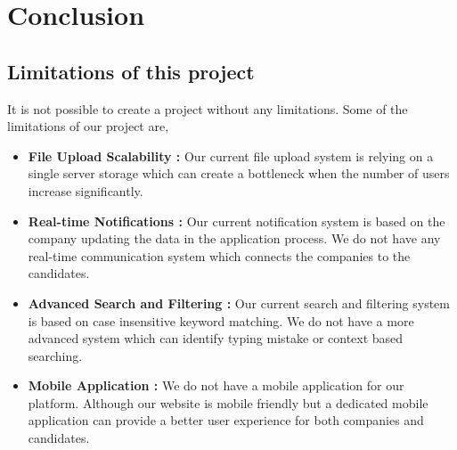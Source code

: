 \documentclass[a4paper, 14pt, openany]{extreport}
\begin{document}
	\chapter{Conclusion}
	\section{Limitations of this project}
	It is not possible to create a project without any limitations. Some of the limitations of our project are,
	\begin{itemize}
		\item \textbf{File Upload Scalability :} Our current file upload system is relying on a single server storage which can create a bottleneck when the number of users increase significantly. 
		\item \textbf{Real-time Notifications :} Our current notification system is based on the company updating the data in the application process. We do not have any real-time communication system which connects the companies to the candidates.
		\item \textbf{Advanced Search and Filtering :} Our current search and filtering system is based on case insensitive keyword matching. We do not have a more advanced system which can identify typing mistake or context based searching. 
		\item \textbf{Mobile Application :} We do not have a mobile application for our platform. Although our website is mobile friendly but a dedicated mobile application can provide a better user experience for both companies and candidates.
	\end{itemize}
\end{document}
